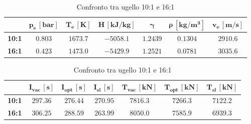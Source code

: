 \begin{table}[H]

\centering
\begin{tabular}{|c|c|c|c|c|c|c|}
\hline
& $\bm{p_e \, [bar]}$ & $\bm{T_e \, [K]}$ & $\bm{H \, [kJ/kg]}$ & $\bm{\gamma}$ & $\bm{\rho \, [kg/m^3]}$ & $\bm{v_e \, [m/s]}$ \\
\hline
\textbf{10:1} & $0.803$ & $1673.7$ & $-5058.1$ & $1.2439$ & $0.1304$ & $2910.6$ \\
\hline
\textbf{16:1} & $0.423$ & $1473.0$ & $-5429.9$ & $1.2521$ & $0.0781$ & $3035.6$ \\
\hline
\end{tabular}

\vspace{5pt}

\begin{tabular}{|c|c|c|c|c|c|c|}
\hline
& $\bm{I_{vac} \, [s]}$ & $\bm{I_{opt} \, [s]}$ & $\bm{I_{sl} \, [s]}$ & $\bm{T_{vac} \, [kN]}$ & $\bm{T_{opt} \, [kN]}$ & $\bm{T_{sl} \, [kN]}$ \\
\hline
\textbf{10:1} & $297.36$ & $276.44$ & $270.95$ & $7816.3$ & $7266.3$ & $7122.2$ \\
\hline
\textbf{16:1} & $306.25$ & $288.59$ & $263.99$ & $8050.0$ & $7585.9$ & $6939.3$ \\
\hline
\end{tabular}

\caption{Confronto tra ugello 10:1 e 16:1}
\label{table:confronto_ugello}

\end{table}
